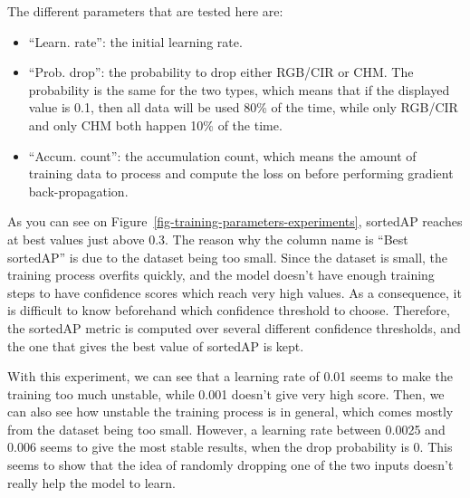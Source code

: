 \documentclass[
]{report}
\providecommand{\tightlist}{%
  \setlength{\itemsep}{0pt}\setlength{\parskip}{0pt}}\usepackage{longtable,booktabs,array}
\begin{document}
The different parameters that are tested here are:

\begin{itemize}
\tightlist
\item
  ``Learn. rate'': the initial learning rate.
\item
  ``Prob. drop'': the probability to drop either RGB/CIR or CHM. The
  probability is the same for the two types, which means that if the
  displayed value is 0.1, then all data will be used 80\% of the time,
  while only RGB/CIR and only CHM both happen 10\% of the time.
\item
  ``Accum. count'': the accumulation count, which means the amount of
  training data to process and compute the loss on before performing
  gradient back-propagation.
\end{itemize}

As you can see on Figure~\ref{fig-training-parameters-experiments},
sortedAP reaches at best values just above 0.3. The reason why the
column name is ``Best sortedAP'' is due to the dataset being too small.
Since the dataset is small, the training process overfits quickly, and
the model doesn't have enough training steps to have confidence scores
which reach very high values. As a consequence, it is difficult to know
beforehand which confidence threshold to choose. Therefore, the sortedAP
metric is computed over several different confidence thresholds, and the
one that gives the best value of sortedAP is kept.

With this experiment, we can see that a learning rate of 0.01 seems to
make the training too much unstable, while 0.001 doesn't give very high
score. Then, we can also see how unstable the training process is in
general, which comes mostly from the dataset being too small. However, a
learning rate between 0.0025 and 0.006 seems to give the most stable
results, when the drop probability is 0. This seems to show that the
idea of randomly dropping one of the two inputs doesn't really help the
model to learn.
\end{document}
